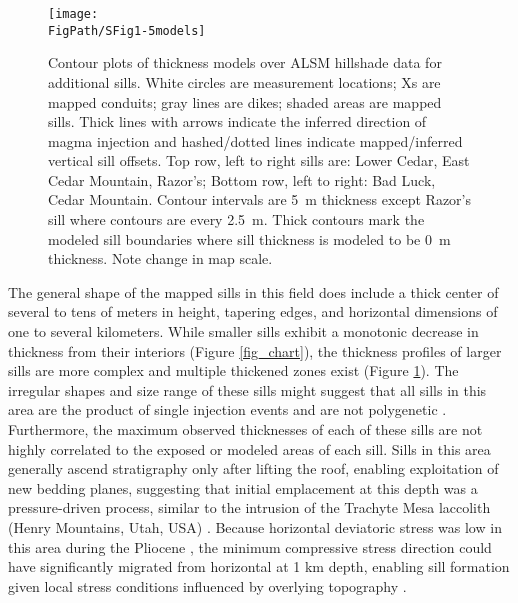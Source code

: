 \begin{figure}[h!]
\centering
\texttt{[image: \\FigPath/SFig1-5models]}
\caption[Contour plots of thickness models over ALSM hillshade data for additional sills]{Contour plots of thickness models over ALSM hillshade data for additional sills. White circles are measurement locations; Xs are mapped conduits; gray lines are dikes; shaded areas are mapped sills. Thick lines with arrows indicate the inferred direction of magma injection and hashed/dotted lines indicate mapped/inferred vertical sill offsets. Top row, left to right sills are: Lower Cedar, East Cedar Mountain, Razor's; Bottom row, left to right: Bad Luck, Cedar Mountain. Contour intervals are 5~m thickness except Razor’s sill where contours are every 2.5~m. Thick contours mark the modeled sill boundaries where sill thickness is modeled to be 0~m thickness. Note change in map scale. }
\label{fig_fivemodels}
\end{figure}

The general shape of the mapped sills in this field does include a thick center of several to tens of meters in height, tapering edges, and horizontal dimensions of one to several kilometers. While smaller sills exhibit a monotonic decrease in thickness from their interiors (Figure \ref{fig_chart}), the thickness profiles of larger sills are more complex and multiple thickened zones exist (Figure \ref{fig_fivemodels}). The irregular shapes and size range of these sills might suggest that all sills in this area are the product of single injection events and are not polygenetic \citep{gudmundsson2012magma}. Furthermore, the maximum observed thicknesses of each of these sills are not highly correlated to the exposed or modeled areas of each sill. Sills in this area generally ascend stratigraphy only after lifting the roof, enabling exploitation of new bedding planes, suggesting that initial emplacement at this depth was a pressure-driven process, similar to the intrusion of the Trachyte Mesa laccolith (Henry Mountains, Utah, USA) \citep{wetmore2009geometry}. Because horizontal deviatoric stress was low in this area during the Pliocene \citep{delaney1986field}, the minimum compressive stress direction could have significantly migrated from horizontal at 1 km depth, enabling sill formation given local stress conditions influenced by overlying topography \citep{gudmundsson2012magma}.


